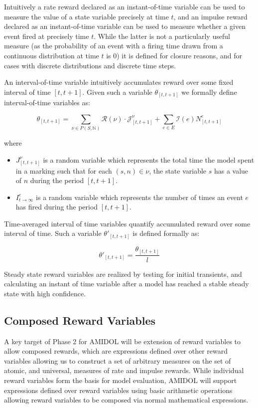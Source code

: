 \documentclass[11pt]{article}
\newcommand{\amidol}{\textsc{AMIDOL}}
\begin{document}
Intuitively a rate reward declared as an instant-of-time variable \cite{freire1990technique} can be used to measure the value of a state variable precisely at time $t$, and an impulse reward declared as an instant-of-time variable can be used to measure whether a given event fired at precisely time $t$.  While the latter is not a particularly useful measure (as the probability of an event with a firing time drawn from a continuous distribution at time $t$ is $0$) it is defined for closure reasons, and for cases with discrete distributions and discrete time steps.

An interval-of-time variable intuitively accumulates reward over some fixed interval of time $[t, t+1]$.  Given such a variable $\theta_{[t, t+1]}$ we formally define interval-of-time variables as:

\[\theta_{[t,t+1]} = \sum_{\nu \in P(S, \mathbb{N})} \mathcal{R}(\nu) \cdot \mathcal{J}^{\nu}_{[t, t+1]} + \sum_{e \in E} \mathcal{I}(e)N^e_{[t,t+1]}\]

where

\begin{itemize}
\item $J^{\nu}_{[t,t+1]}$ is a random variable which represents the total time the model spent in a marking such that for each $(s, n) \in \nu$, the state variable $s$ has a value of $n$ during the period $[t, t+1]$.
\item $I^e_{t\rightarrow\infty}$ is a random variable which represents the number of times an event $e$ has fired during the period $[t, t+1]$.
\end{itemize}

Time-averaged interval of time variables quantify accumulated reward over some interval of time.  Such a variable $\theta'_{[t,t+1]}$ is defined formally as:

\[\theta'_{[t,t+1]} = \frac{\theta_{[t,t+1]}}{l}\]

Steady state reward variables are realized by testing for initial transients, and calculating an instant of time variable after a model has reached a stable steady state with high confidence.

\subsection{Composed Reward Variables}

A key target of Phase 2 for \amidol{} will be extension of reward variables to allow composed rewards, which are expressions defined over other reward variables allowing us to construct a set of arbitrary measures on the set of atomic, and universal, measures of rate and impulse rewards. While individual reward variables form the basis for model evaluation, \amidol{} will support expressions defined over reward variables using basic arithmetic operations allowing reward variables to be composed via normal mathematical expressions.
\end{document}
